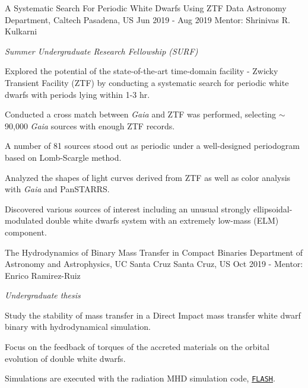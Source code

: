 \begin{cvexperiences}
\cvexperience
{A Systematic Search For Periodic White Dwarfs Using ZTF Data} %
{Astronomy Department, Caltech} %
{Pasadena, US} %
{Jun 2019 - Aug 2019} %
{Mentor: Shrinivas R. Kulkarni}
{ %
	\begin{cvitems}
		\item {\textit{Summer Undergraduate Research Fellowship (SURF)}}
		\item {Explored the potential of the state-of-the-art time-domain facility - Zwicky Transient Facility (ZTF) by conducting a systematic search for periodic white dwarfs with periods lying within 1-3 hr.}
		\item {Conducted a cross match between \textit{Gaia} and ZTF was performed, selecting $\sim$ 90,000 \textit{Gaia} sources with enough ZTF records.}
		\item {A number of 81 sources stood out as periodic under a well-designed periodogram based on Lomb-Scargle method.}
		\item {Analyzed the shapes of light curves derived from ZTF as well as color analysis with \textit{Gaia} and PanSTARRS.}
		\item {Discovered various sources of interest including an unusual strongly ellipsoidal-modulated double white dwarfs system with an extremely low-mass (ELM) component.}
	\end{cvitems}
}

\cvexperience
{The Hydrodynamics of Binary Mass Transfer in Compact Binaries} %
{Department of Astronomy and Astrophysics, UC Santa Cruz} %
{Santa Cruz, US} %
{Oct 2019 -} %
{Mentor: Enrico Ramirez-Ruiz}
{ %
	\begin{cvitems}
		\item {\textit{Undergraduate thesis}}
		\item {Study the stability of mass transfer in a Direct Impact mass transfer white dwarf binary with hydrodynamical simulation.}
		\item {Focus on the feedback of torques of the accreted materials on the orbital evolution of double white dwarfs.}
		\item {Simulations are executed with the radiation MHD simulation code, \href{http://flash.uchicago.edu/site/}{\texttt{FLASH}}.}
	\end{cvitems}
}

\end{cvexperiences}
